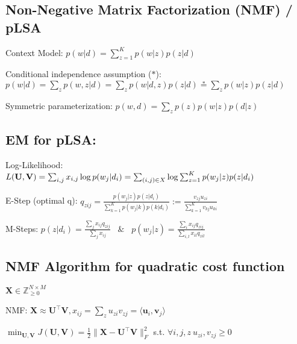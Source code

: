 \documentclass[a4paper, 11pt, landscape]{article}
\begin{document}
\begin{multicols*}{3}
\section{Non-Negative Matrix Factorization (NMF) / pLSA}
\begin{compactdesc}
	\item[Context Model:] $p(w | d) = \sum_{z=1}^K p(w | z) p(z | d)$
	\item[Conditional independence assumption ($*$):] $p(w|d) = \sum_z p(w,z|d) = \sum_z p(w|d,z)p(z|d) \stackrel{*}{=} \sum_z p(w|z)p(z|d)$ 
	\item[Symmetric parameterization:] $p(w, d) = \sum_z p(z)p(w | z) p(d | z)$
\end{compactdesc}

\subsection{EM for pLSA:}
\begin{compactenum}
  \item Log-Likelihood: $L(\mathbf{U}, \mathbf{V}) = \sum_{i,j} x_{i,j}\log p(w_j|d_i) = \break \sum_{(i,j) \in X} \log \sum_{z=1}^K p(w_j|z)p(z|d_i)$
	\item E-Step (optimal q): $q_{zij} = \frac{p(w_j|z)p(z|d_i)}{\sum_{k=1}^K p(w_j|k)p(k|d_i)} := \frac{v_{zj}u_{zi}}{\sum_{k=1}^K v_{kj}u_{ki}}$
	\item M-Steps: $p(z|d_i) = \frac{\sum_j x_{ij}q_{zij}}{\sum_j x_{ij}}\hspace{10pt}\&\hspace{10pt} p(w_j|z) = \frac{\sum_i x_{ij}q_{zij}}{\sum_{i,l}x_{il}q_{zil}}$
\end{compactenum}

\subsection{NMF Algorithm for quadratic cost function}
\begin{inparaitem}[\color{red}\textbullet]
	\item $\mathbf{X} \in \mathbb{Z}^{N \times M}_{\geq 0}$
	\item NMF: $\mathbf{X} \approx \mathbf{U^\top V}, x_{ij} = \sum_z u_{zi}v_{zj} = \langle \mathbf{u}_i, \mathbf{v}_j \rangle$
\end{inparaitem}

$\min_{\mathbf{U}, \mathbf{V}} J(\mathbf{U}, \mathbf{V}) = \frac{1}{2} \|\mathbf{X} - \mathbf{U}^\top\mathbf{V}\|_F^2$ s.t. $\forall i,j,z~u_{zi},v_{zj} \geq 0 $


\end{multicols*}
\end{document}
